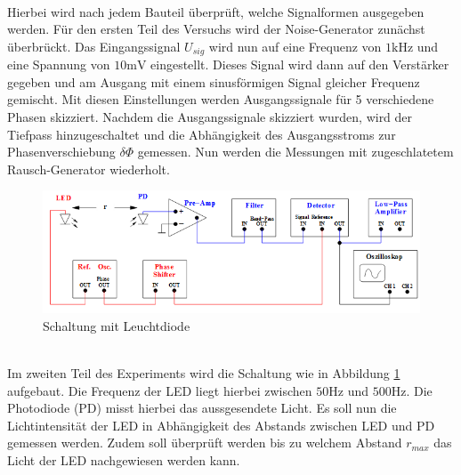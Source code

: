 \\
Hierbei wird nach jedem Bauteil überprüft, welche Signalformen ausgegeben werden.
Für den ersten Teil des Versuchs wird der Noise-Generator zunächst überbrückt.
Das Eingangssignal $U_{sig}$ wird nun auf eine Frequenz von $1\si{\kilo\hertz}$
und eine Spannung von $10\si{\milli\volt}$ eingestellt. Dieses Signal wird dann
auf den Verstärker gegeben und am Ausgang mit einem sinusförmigen Signal gleicher
Frequenz gemischt. Mit diesen Einstellungen werden Ausgangssignale für 5 verschiedene
Phasen skizziert.
Nachdem die Ausgangssignale skizziert wurden, wird der Tiefpass hinzugeschaltet
und die Abhängigkeit des Ausgangsstroms zur Phasenverschiebung
$\delta\Phi$ gemessen.
Nun werden die Messungen mit zugeschlatetem Rausch-Generator wiederholt.
\\
\begin{figure}
  \centering
  \includegraphics[width=\textwidth]{Bilder/LEDSchaltung.jpg}
  \caption{Schaltung mit Leuchtdiode}
  \label{fig:led}
\end{figure}  %
\\
Im zweiten Teil des Experiments wird die Schaltung wie in Abbildung \ref{fig:led}
aufgebaut. Die Frequenz der LED liegt hierbei zwischen $50 \si{\hertz}$ und
$500 \si{\hertz}$. %
 Die Photodiode (PD) misst hierbei das aussgesendete Licht.
Es soll nun die Lichtintensität der LED in Abhängigkeit des Abstands
zwischen LED und PD gemessen werden. Zudem soll überprüft werden bis zu welchem
Abstand $r_{max}$ das Licht der LED nachgewiesen werden kann.
\newpage

